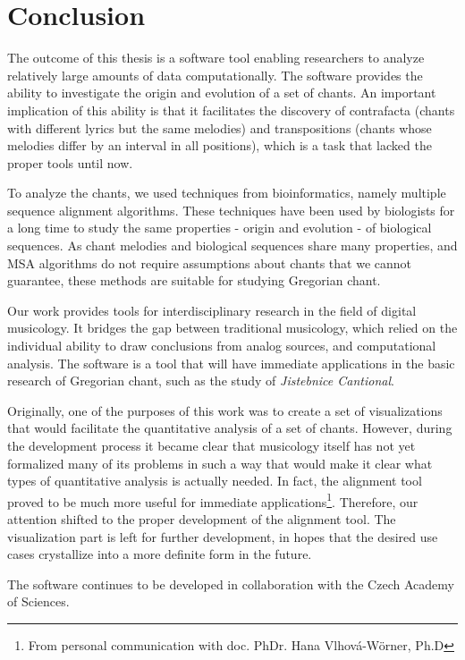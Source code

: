 \chapter*{Conclusion}

The outcome of this thesis is a software tool enabling researchers to analyze relatively large amounts of data computationally. The software
provides the ability to investigate the origin and evolution of a set of chants. An important implication of this ability is that it facilitates
the discovery of contrafacta (chants with different lyrics but the same melodies) and transpositions (chants whose melodies differ by an interval
in all positions), which is a task that lacked the proper tools until now.

To analyze the chants, we used techniques from bioinformatics, namely multiple sequence alignment algorithms. These techniques have been used by
biologists for a long time to study the same properties - origin and evolution - of biological sequences. As chant melodies and biological sequences
share many properties, and MSA algorithms do not require assumptions about chants that we cannot guarantee, these methods are suitable
for studying Gregorian chant.

Our work provides tools for interdisciplinary research in the field of digital musicology. It bridges the gap between traditional musicology,
which relied on the individual ability to draw conclusions from analog sources, and computational analysis. The software is a tool
that will have immediate applications in the basic research of Gregorian chant, such as the study of \emph{Jistebnice Cantional}.

Originally, one of the purposes of this work was to create a set of visualizations that would facilitate the quantitative analysis of a set of chants.
However, during the development process it became clear that musicology itself has not yet formalized many of its problems in such a way that 
would make it clear what types of quantitative analysis is actually needed. In fact, the alignment tool proved to be much more useful for immediate
applications\footnote{From personal communication with doc. PhDr. Hana Vlhová-Wörner, Ph.D}. Therefore, our attention shifted to the proper
development of the alignment tool. The visualization part is left for further development, in hopes that the desired use cases crystallize into
a more definite form in the future.

The software continues to be developed in collaboration with the Czech Aca\-demy of Sciences.

